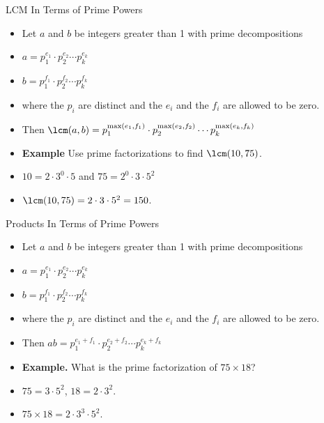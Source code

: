 \documentclass{beamer}
\begin{document}
\begin{frame}{LCM In Terms of Prime Powers}

\begin{itemize}
  \item Let $a$ and $b$ be integers greater than 1 with prime decompositions
  \item $a=p_1^{e_1} \cdot p_2^{e_2} \cdots p_k^{e_k}$
  \item $b=p_1^{f_1} \cdot p_2^{f_2} \cdots p_k^{f_k}$
  \item where the $p_i$ are distinct and the $e_i$ and the $f_i$ are allowed to be zero.
  \item Then $\lcm(a,b) = p_1^{\max(e_1,f_1)} \cdot p_2^{\max(e_2,f_2)} \cdots p_k^{\max(e_k,f_k)}$
  \item \textbf{Example} Use prime factorizations to find $\lcm(10, 75)$.
  \item $10=2\cdot 3^0 \cdot 5$ and $75 = 2^0\cdot 3 \cdot 5^2$
  \item $\lcm(10,75) = 2 \cdot 3 \cdot 5^2 = 150$.
\end{itemize}

\end{frame}

\begin{frame}{Products In Terms of Prime Powers}

\begin{itemize}
  \item Let $a$ and $b$ be integers greater than 1 with prime decompositions
  \item $a=p_1^{e_1} \cdot p_2^{e_2} \cdots p_k^{e_k}$
  \item $b=p_1^{f_1} \cdot p_2^{f_2} \cdots p_k^{f_k}$
  \item where the $p_i$ are distinct and the $e_i$ and the $f_i$ are allowed to be zero.
  \item Then $ab = p_1^{e_1+f_1} \cdot p_2^{e_2+f_2} \cdots p_k^{e_k+f_k}$
  \item \textbf{Example.} What is the prime factorization of $75 \times 18$?
  \item $75 = 3\cdot 5^2$, $18 = 2 \cdot 3^2$.
  \item $75 \times 18 = 2 \cdot 3^3 \cdot 5^2$.
\end{itemize}

\end{frame}
\end{document}
